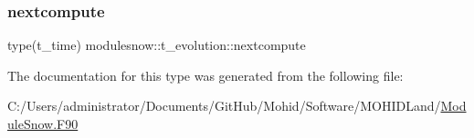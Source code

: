 \mbox{\label{structmodulesnow_1_1t__evolution_a53d990b847600d04bfb0005e4d446549}} 
\subsubsection{\texorpdfstring{nextcompute}{nextcompute}}
{\footnotesize\ttfamily type(t\+\_\+time) modulesnow\+::t\+\_\+evolution\+::nextcompute\hspace{0.3cm}{\ttfamily [private]}}



The documentation for this type was generated from the following file\+:\begin{DoxyCompactItemize}
\item 
C\+:/\+Users/administrator/\+Documents/\+Git\+Hub/\+Mohid/\+Software/\+M\+O\+H\+I\+D\+Land/\mbox{\hyperlink{_module_snow_8_f90}{Module\+Snow.\+F90}}\end{DoxyCompactItemize}
